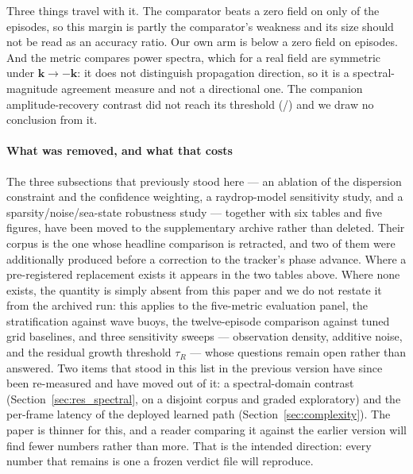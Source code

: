 \documentclass[review]{elsarticle}
\begin{document}
Three things travel with it. The comparator beats a zero field on only
\SpecCmpBetter{} of the \SpecN{} episodes, so this margin is partly the comparator's
weakness and its size should not be read as an accuracy ratio. Our own arm is below a
zero field on \SpecOwnBelowZero{} episodes.
And the metric compares power spectra, which for a real field are symmetric under
$\mathbf{k}\to-\mathbf{k}$: it does not distinguish propagation direction, so it is a
spectral-magnitude agreement measure and not a directional one. The companion
amplitude-recovery contrast did not reach its threshold (\SpecHs{}/\SpecN{}) and we
draw no conclusion from it.

\paragraph{What was removed, and what that costs}
The three subsections that previously stood here --- an ablation of the dispersion
constraint and the confidence weighting, a raydrop-model sensitivity study, and a
sparsity/noise/sea-state robustness study --- together with six tables and five
figures, have been moved to the supplementary archive rather than deleted.
Their
corpus is the one whose headline comparison is retracted, and two of them were
additionally produced before a correction to the tracker's phase advance. Where a
pre-registered replacement exists it appears in the two tables above. Where none
exists, the quantity is simply absent from this paper and we do not restate it
from the archived run: this applies to the five-metric evaluation panel, the
stratification against wave buoys, the twelve-episode comparison against tuned
grid baselines, and three sensitivity sweeps --- observation density, additive
noise, and the residual growth threshold $\tau_R$ --- whose questions remain open
rather than answered.
Two items that stood in this list in the previous version have since
been re-measured and have moved out of it: a spectral-domain contrast
(Section~\ref{sec:res_spectral}, on a disjoint corpus and graded exploratory) and the
per-frame latency of the deployed learned path (Section~\ref{sec:complexity}). The
paper is thinner for this, and a reader comparing it against the
earlier version will find fewer numbers rather than more. That is the intended
direction: every number that remains is one a frozen verdict file will reproduce.
\end{document}
